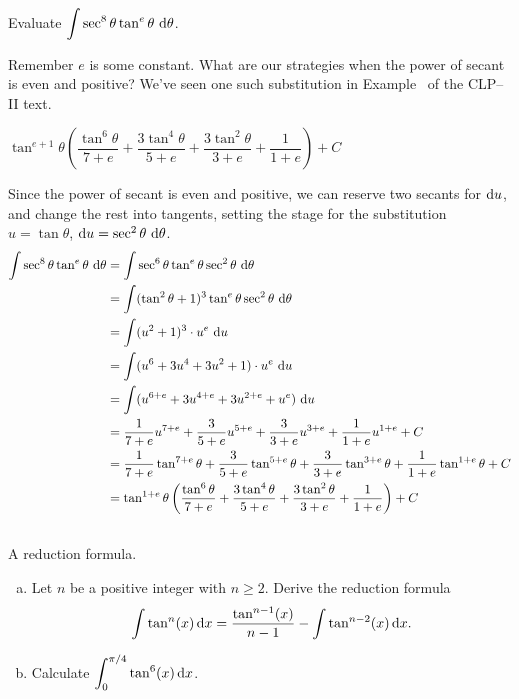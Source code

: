 \begin{Mquestion}
Evaluate $\displaystyle\int \sec^{8}\theta \tan^{e}\theta ~\mathrm{d}\theta$.
\end{Mquestion}
\begin{hint}
Remember $e$ is some constant. What are our strategies when the power of secant is even and positive? We've seen one such substitution in Example~
of the CLP--II text.
\end{hint}
\begin{answer}
$\tan^{e+1}\theta\left(
\dfrac{\tan^{6}\theta}{7+e}+\dfrac{3\tan^4\theta}{5+e}+\dfrac{3\tan^2\theta}{3+e}+\dfrac{1}{1+e}
\right)+C$
\end{answer}
\begin{solution}
Since the power of secant is even and positive, we can reserve two secants for $\mathrm{d}u$, and change the rest into tangents, setting the stage for the substitution $u = \tan \theta$, $\mathrm{d}u=\sec^2 \theta~\mathrm{d}\theta$.
\begin{align*}
\int \sec^{8}\theta \tan^{e}\theta ~\mathrm{d}\theta&=\int \sec^6 \theta \tan^e \theta \sec^2 \theta~\mathrm{d}\theta\\
&=\int (\tan^2 \theta +1)^3  \tan^e \theta \sec^2 \theta~\mathrm{d}\theta\\
&=\int (u^2+1)^3 \cdot u^e ~\mathrm{d}u\\
&=\int (u^6+3u^4 +3u^2+1) \cdot u^e ~\mathrm{d}u\\
&=\int (u^{6+e}+3u^{4+e} +3u^{2+e}+ u^e) ~\mathrm{d}u\\
&=\frac{1}{7+e}u^{7+e}+\frac{3}{5+e}u^{5+e}+\frac{3}{3+e}u^{3+e}+\frac{1}{1+e}u^{1+e}+C
\\
&=\frac{1}{7+e}\tan^{7+e}\theta+\frac{3}{5+e}\tan^{5+e}\theta+\frac{3}{3+e}\tan^{3+e}\theta+\frac{1}{1+e}\tan^{1+e}\theta+C\\
&=\tan^{1+e}\theta\left(
\frac{\tan^{6}\theta}{7+e}+\frac{3\tan^4\theta}{5+e}+\frac{3\tan^2\theta}{3+e}+\frac{1}{1+e}
\right)+C
\end{align*}
\end{solution}





\subsection*{\Application}



\begin{Mquestion}[2001D]
A reduction formula.
\begin{enumerate}[(a)]
\item
Let $n$ be a positive integer with $n\ge 2$.
Derive the reduction formula
\[\int\tan^n(x)\,\mathrm{d}x=\frac{\tan^{n-1}(x)}{n-1}
-\int\tan^{n-2}(x)\,\mathrm{d}x.\]
\item
Calculate $\displaystyle\int_0^{\pi/4}\tan^6(x)\,\mathrm{d}x$.
\end{enumerate}
\end{Mquestion}

